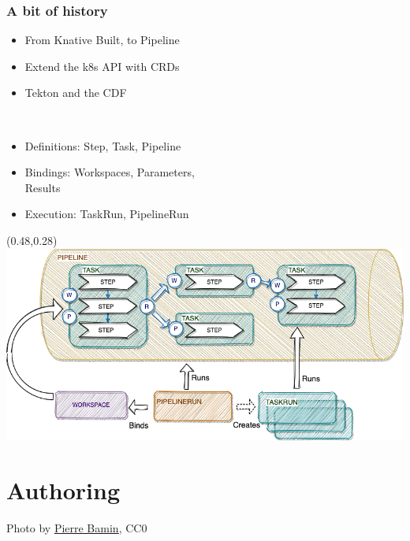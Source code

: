 \documentclass[aspectratio=169,11pt,hyperref={colorlinks=true}]{beamer}
\begin{document}
\begin{lgrayrwhiteframe}
  \frametitle{A bit of history}
  \begin{itemize}
    \item From Knative Built, to Pipeline
    \item Extend the k8s API with CRDs
    \item Tekton and the CDF
  \end{itemize}
  \vspace{0.03\paperheight}
  ~~~~~
  \vspace{0.03\paperheight}
  \begin{itemize}
    \item Definitions: Step, Task, Pipeline
    \item Bindings: Workspaces, Parameters, \\Results
    \item Execution: TaskRun, PipelineRun
  \end{itemize}
  \begin{textblock*}{0.51\paperwidth}(0.48\paperwidth,0.28\paperheight)
    \includegraphics[width=0.5\paperwidth]{img/tekton-workspaces.png}
  \end{textblock*}
\end{lgrayrwhiteframe}

\section[Authoring]{Authoring}

\begin{sectionwithpicrx}{Photo by \href{https://unsplash.com/@bamin}{\underline{Pierre Bamin}}, CC0}
\end{sectionwithpicrx}
\end{document}
